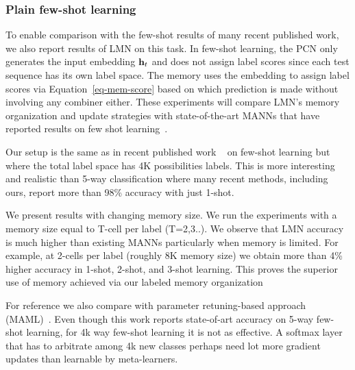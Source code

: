 \documentclass[letterpaper]{article} %
\newcommand{\vek}[1]{{\bf {#1}}}
\newcommand{\vh}{{\vek{h}}}
\begin{document}




\subsubsection{Plain few-shot learning}
To enable comparison with the few-shot results of many recent published work, we also report results of LMN on this task.
%
In few-shot learning, the PCN only generates the input embedding $\vh_t$ and does not assign label scores since each test sequence has its own label space. The memory uses the embedding to assign label scores via Equation~\ref{eq-mem-score} based on which prediction is made without involving any combiner either.
These experiments will compare LMN's memory organization and update strategies with state-of-the-art MANNs that have reported results on few shot learning~\cite{kaiser2017}.  

Our setup is the same as in recent published work ~  on few-shot learning but where the total label space has 4K possibilities labels.  This is more interesting and realistic than 5-way classification where many recent methods, including ours, report more than 98\% accuracy with just 1-shot.

We present results with changing memory size. We run the experiments with a memory size equal to T-cell per label (T=2,3..).  We observe that LMN accuracy is much higher than existing MANNs particularly when memory is limited. For example, at 2-cells per label (roughly 8K memory size) we obtain more than 4\% higher accuracy in 1-shot, 2-shot, and 3-shot learning. This proves the superior use of memory achieved via our labeled memory organization

For reference we also compare with parameter retuning-based approach (MAML)~.  Even though this work reports state-of-art accuracy on 5-way few-shot learning, for 4k way few-shot learning it is not as effective.  A softmax layer that has to arbitrate among 4k new classes perhaps need lot more gradient updates than learnable by meta-learners.
\end{document}
